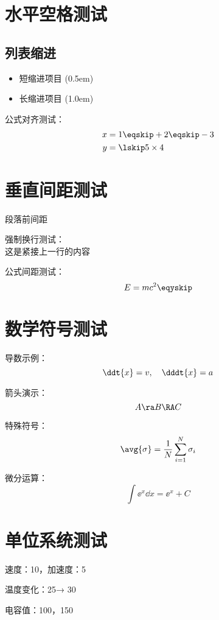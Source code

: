 
	
	\section*{水平空格测试}
	\subsection*{列表缩进}
	\begin{itemize}[leftmargin=2em]
		\item \titem 短缩进项目 (0.5em)
		\item \exitem 长缩进项目 (1.0em)
	\end{itemize}
	
	公式对齐测试：
	\begin{align*}
		x &= 1 \eqskip + 2 \eqskip - 3 \\
		y &= \lskip 5 \times 4
	\end{align*}
	
	\section*{垂直间距测试}
	段落前间距 \yskip
	
	\lipsum[1][1-3]\bxskip %
	
	强制换行测试：\\ \rcyskip 这是紧接上一行的内容
	
	公式间距测试：
	\begin{equation}
		E=mc^2 \eqyskip
	\end{equation}
	
	\section*{数学符号测试}
	导数示例：
	\[
	\ddt{x} = v, \quad \dddt{x} = a
	\]
	
	箭头演示：
	\[
	A \ra B \RA C
	\]
	
	特殊符号：
	\[
	\avg{\sigma} = \frac{1}{N}\sum_{i=1}^N \sigma_i
	\]
	
	微分运算：
	\[
	\int \ee^{x} \dd x = \ee^{x} + C
	\]
	
	\section*{单位系统测试}
	速度：10\mps，加速度：5\mpss
	
	温度变化：25\OC → 30\OC
	
	电容值：100\muF，150\pF
	
